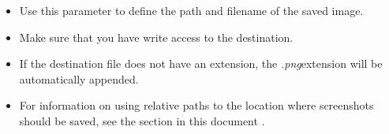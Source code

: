 \begin{itemize}
\item Use this parameter to define the path and filename of the saved image.
\item Make sure that you have write access to the destination.
\item If the destination file does not have an extension, the \emph{.png}extension will be automatically appended.
\item For information on using relative paths to the location where screenshots should be saved, see the section in this document .
\end{itemize}
